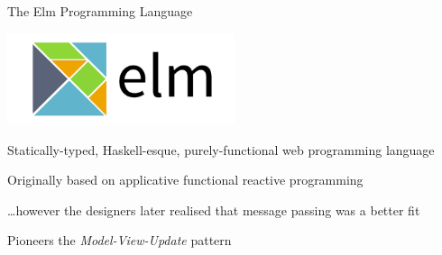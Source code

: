 \begin{frame}{The Elm Programming Language}

  \begin{center}
    \includegraphics[width=0.5\textwidth]{images/ElmLogo.png}
  \end{center}

  \begin{fullpageitemize}
  \item Statically-typed, Haskell-esque, purely-functional web programming language
  \item Originally based on applicative functional reactive programming
    \begin{itemize}
      \itemR \ldots however the designers later realised that message passing was a better fit
    \end{itemize}
    \item Pioneers the \emph{Model-View-Update} pattern
  \end{fullpageitemize}
\end{frame}


